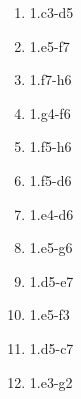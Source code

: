 \begin{enumerate}
\setcounter{enumi}{\value{d_counter}}
\item 1.\knight{}c3-d5\mate{}
\item 1.\knight{}e5-f7\mate{}
\item 1.\knight{}f7-h6\mate{}
\item 1.\knight{}g4-f6\mate{}
\item 1.\knight{}f5-h6\mate{}
\item 1.\knight{}f5-d6\mate{}

\item 1.\knight{}e4-d6\mate{}
\item 1.\knight{}e5-g6\mate{}
\item 1.\knight{}d5-e7\mate{}
\item 1.\knight{}e5-f3\mate{}
\item 1.\knight{}d5-c7\mate{}
\item 1.\knight{}e3-g2\mate{}
\setcounter{d_counter}{\value{enumi}}
\end{enumerate}